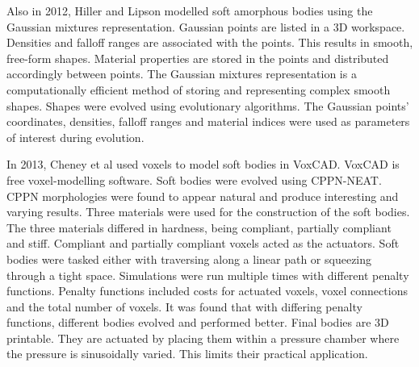 Also in 2012, Hiller and Lipson modelled soft amorphous bodies using the Gaussian mixtures representation. Gaussian points are listed in a 3D workspace. Densities and falloff ranges are associated with the points. This results in smooth, free-form shapes. Material properties are stored in the points and distributed accordingly between points. The Gaussian mixtures representation is a computationally efficient method of storing and representing complex smooth shapes. Shapes were evolved using evolutionary algorithms. The Gaussian points' coordinates, densities, falloff ranges and material indices were used as parameters of interest during evolution.\cite{Hiller2012}

In 2013, Cheney et al used voxels to model soft bodies in VoxCAD. VoxCAD is free voxel-modelling software. Soft bodies were evolved using CPPN-NEAT. CPPN morphologies were found to appear natural and produce interesting and varying results. Three materials were used for the construction of the soft bodies. The three materials differed in hardness, being compliant, partially compliant and stiff. Compliant and partially compliant voxels acted as the actuators. Soft bodies were tasked either with traversing along a linear path or squeezing through a tight space. Simulations were run multiple times with different penalty functions. Penalty functions included costs for actuated voxels, voxel connections and the total number of voxels. It was found that with differing penalty functions, different bodies evolved and performed better. Final bodies are 3D printable. They are actuated by placing them within a pressure chamber where the pressure is sinusoidally varied. This limits their practical application. \cite{Cheney2013a,Cheney2015}